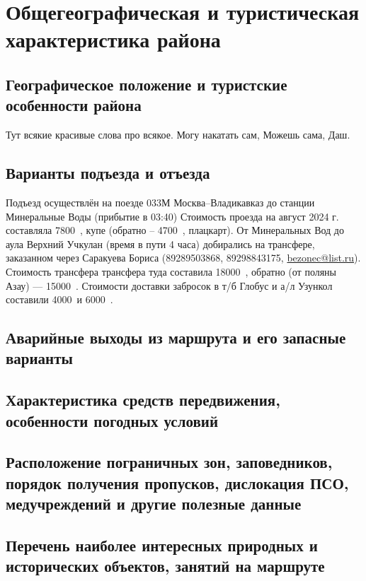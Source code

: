 \section{Общегеографическая и туристическая характеристика района}

\subsection{Географическое положение и туристские особенности района}
Тут всякие красивые слова про всякое. Могу накатать сам, Можешь  сама, Даш. 


\subsection{Варианты подъезда и отъезда}
Подъезд осуществлён на поезде 033М Москва--Владикавказ до станции Минеральные Воды (прибытие в 03:40) Стоимость проезда на август 2024 г. составляла 7800~\faRub, купе (обратно – 4700~\faRub, плацкарт). От Минеральных Вод до аула Верхний Учкулан (время в пути 4 часа) добирались на трансфере, заказанном через Саракуева Бориса (89289503868, 89298843175,  \href{mailto: bezonec@list.ru}{bezonec@list.ru}). Стоимость трансфера трансфера туда составила 18000~\faRub, обратно (от поляны Азау) — 15000~\faRub. Стоимости доставки забросок в т/б Глобус и а/л Узункол составили 4000~\faRub  и 6000~\faRub.

\subsection{Аварийные выходы из маршрута и его запасные варианты}

\subsection{Характеристика средств передвижения, особенности погодных условий}

\subsection{Расположение пограничных зон, заповедников, порядок получения пропусков, дислокация ПСО, медучреждений и другие полезные данные}

\subsection{Перечень наиболее интересных природных и исторических объектов, занятий на маршруте}
\newpage